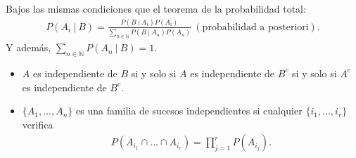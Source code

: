 \begin{teo}
    Bajos las mismas condiciones que el teorema de la probabilidad total:
    \begin{align*}
        P(A_i \ | \ B) = \frac{P(B \ | \ A_i)P(A_i)}{\sum_{n \in \mathbb{N}}{P(B \ | \ A_n)P(A_n)}} \ (\text{probabilidad a posteriori}).
    \end{align*}
    Y además, $\sum_{n \in \mathbb{N}}{P(A_n \ | \ B)}= 1$.
\end{teo}

\begin{obs}
    \begin{itemize}
        \item $A$ es independiente de $B$ si y solo si $A$ es independiente de $B^c$ si y solo si $A^c$ es independiente de $B^c$.
        \item $\{A_1,...,A_n\}$ es una familia de sucesos independientes si cualquier $\{i_1,...,i_r\}$ verifica
              \begin{align*}
                  P(A_{i_1} \cap ... \cap A_{i_r}) = \prod_{j=1}^{r}{P(A_{i_j})}.
              \end{align*}
    \end{itemize}
\end{obs}